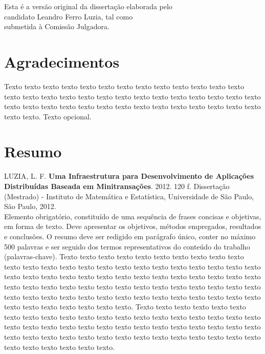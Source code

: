 \documentclass[11pt,twoside,a4paper]{book}
\begin{document}
    \vskip 2cm

    \begin{flushright}
	Esta é a versão original da dissertação elaborada pelo\\
	candidato Leandro Ferro Luzia, tal como \\
	submetida à Comissão Julgadora.
    \end{flushright}

\pagebreak


\chapter*{Agradecimentos}
Texto texto texto texto texto texto texto texto texto texto texto texto texto
texto texto texto texto texto texto texto texto texto texto texto texto texto
texto texto texto texto texto texto texto texto texto texto texto texto texto
texto texto texto texto. Texto opcional.

\chapter*{Resumo}

\noindent LUZIA, L. F. \textbf{Uma Infraestrutura para Desenvolvimento de Aplicações Distribuídas Baseada em Minitransações}. 
2012. 120 f.
Dissertação (Mestrado) - Instituto de Matemática e Estatística,
Universidade de São Paulo, São Paulo, 2012.
\\

Elemento obrigatório, constituído de uma sequência de frases concisas e
objetivas, em forma de texto.  Deve apresentar os objetivos, métodos empregados,
resultados e conclusões.  O resumo deve ser redigido em parágrafo único, conter
no máximo 500 palavras e ser seguido dos termos representativos do conteúdo do
trabalho (palavras-chave). 
Texto texto texto texto texto texto texto texto texto texto texto texto texto
texto texto texto texto texto texto texto texto texto texto texto texto texto
texto texto texto texto texto texto texto texto texto texto texto texto texto
texto texto texto texto texto texto texto texto texto texto texto texto texto
texto texto texto texto texto texto texto texto texto texto texto texto texto
texto texto texto texto texto texto texto texto.
Texto texto texto texto texto texto texto texto texto texto texto texto texto
texto texto texto texto texto texto texto texto texto texto texto texto texto
texto texto texto texto texto texto texto texto texto texto texto texto texto
texto texto texto texto texto texto texto texto texto texto texto texto texto
texto texto.
\\
\end{document}
